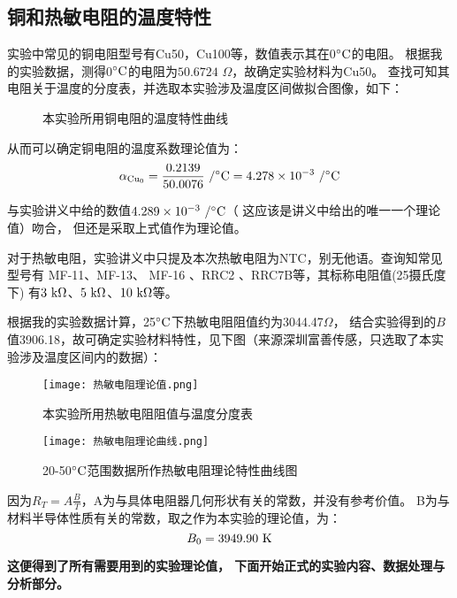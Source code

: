 \documentclass[11pt]{article}
\begin{document}
\subsection{铜和热敏电阻的温度特性}

实验中常见的铜电阻型号有Cu50，Cu100等，数值表示其在0$^\circ \rm C$的电阻。
根据我的实验数据，测得0$^\circ \rm C$的电阻为$50.6724\,\,\Omega$，故确定实验材料为Cu50。
查找可知其电阻关于温度的分度表，并选取本实验涉及温度区间做拟合图像，如下：
\begin{figure}[H] 
    \centering
    \caption{本实验所用铜电阻的温度特性曲线}
\end{figure}

从而可以确定铜电阻的温度系数理论值为：
\[
   \alpha_{\rm Cu_0}=\frac{0.2139}{50.0076}\,\,/^\circ \rm C=4.278\times 10^{-3}\,\,/^\circ \rm C
\]

与实验讲义中给的数值$4.289\times 10^{-3}\,\,/^\circ \rm C$（
这应该是讲义中给出的唯一一个理论值）吻合，
但还是采取上式值作为理论值。

对于热敏电阻，实验讲义中只提及本次热敏电阻为NTC，别无他语。查询知常见型号有 MF-11、MF-13、 MF-16 、RRC2 、RRC7B等，其标称电阻值(25摄氏度下)
有$3\,\,\rm k\Omega$、$5\,\,\rm k\Omega$、$10\,\,\rm k\Omega$等。

根据我的实验数据计算，25$^\circ \rm C$下热敏电阻阻值约为3044.47$\Omega$，
结合实验得到的$B$值3906.18，故可确定实验材料特性，见下图（来源深圳富善传感，只选取了本实验涉及温度区间内的数据）：
\begin{figure}[H]
    \centering
    \texttt{[image: 热敏电阻理论值.png]}
    \caption{本实验所用热敏电阻阻值与温度分度表}
\end{figure}
\begin{figure}[H]
    \centering
    \texttt{[image: 热敏电阻理论曲线.png]}
    \caption{20-50$^\circ \rm C$范围数据所作热敏电阻理论特性曲线图}
\end{figure}
因为$R_T=A\frac{B}{T}$，A为与具体电阻器几何形状有关的常数，并没有参考价值。
B为与材料半导体性质有关的常数，取之作为本实验的理论值，为：
\[
   B_0= 3949.90 \,\, \rm K
\]

\textbf{这便得到了所有需要用到的实验理论值，
下面开始正式的实验内容、数据处理与分析部分。}
\end{document}
